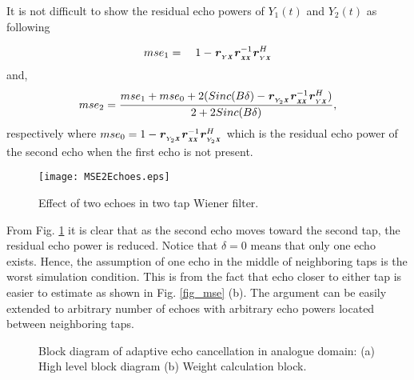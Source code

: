 \documentclass[twocolumn]{IEEEtran}
\begin{document}
It is not difficult to show the residual echo powers of $Y_1(t)$ and
$Y_2(t)$ as following

\begin{eqnarray}\label{resEcho1}
mse_1&{}={}&1-
\textbf{\textit{r}}_{{}_{Y\textbf{\textit{X}}}}\textbf{\textit{r}}_{{}_{\textbf{\textit{XX}}}}^{-1}\textbf{\textit{r}}_{{}_{Y\textbf{\textit{X}}}}^H
\end{eqnarray}
and,
\begin{equation}\label{resEcho2}
mse_2=\frac{mse_1+mse_0+2(Sinc(B\delta)-\textbf{\textit{r}}_{{}_{Y_2\textbf{\textit{X}}}}\textbf{\textit{r}}_{{}_{\textbf{\textit{XX}}}}^{-1}\textbf{\textit{r}}_{{}_{Y\textbf{\textit{X}}}}^H)}{2+2Sinc(B\delta)},
\end{equation}
respectively where $mse_0=1-
\textbf{\textit{r}}_{{}_{Y_2\textbf{\textit{X}}}}\textbf{\textit{r}}_{{}_{\textbf{\textit{XX}}}}^{-1}\textbf{\textit{r}}_{{}_{Y_2\textbf{\textit{X}}}}^H$
which is the residual echo power of the second echo when the first
echo is not present.

\begin{figure}[!t]

\centering
    {\texttt{[image: MSE2Echoes.eps]}}


\caption{Effect of two echoes in two tap Wiener filter.
\label{fig_mse2echoes} }

\end{figure}


From Fig. \ref{fig_mse2echoes} it is clear that as the second echo
moves toward the second tap, the residual echo power is reduced.
Notice that $\delta=0$ means that only one echo exists. Hence, the
assumption of one echo in the middle of neighboring taps is the
worst simulation condition. This is from the fact that echo closer
to either tap is easier to estimate as shown in Fig. \ref{fig_mse}
(b). The argument can be easily extended to arbitrary number of
echoes with arbitrary echo powers located between neighboring taps.


\begin{figure}[!ht]

\centering {}

\caption{Block diagram of adaptive echo cancellation in analogue
domain: (a) High level block diagram (b) Weight calculation block.
\label{fig_blk} }

\end{figure}
\end{document}
